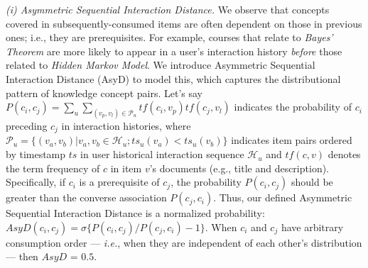 \textit{(i) Asymmetric Sequential Interaction Distance.}
We observe that concepts covered in subsequently-consumed
items are often dependent on those in previous ones; i.e., they are prerequisites. 
For example, courses that relate to \textit{Bayes' Theorem} are more likely to appear in a user's interaction history \textit{before} those related to \textit{Hidden Markov Model}.
We introduce Asymmetric Sequential Interaction Distance (AsyD) to model this, which captures the distributional pattern of knowledge concept pairs.
Let's say $P(c_i,c_j) = \sum_{u} \sum_{(v_{p}, v_{l}) \in \mathcal{P}_u} tf(c_i, v_{p}) tf(c_j, v_{l})$ indicates the probability of $c_i$ preceding $c_j$ in interaction histories, where $\mathcal{P}_u = \{(v_a,v_b) | v_a, v_b \in \mathcal{H}_u; ts_u(v_a)<ts_u(v_b)\}$ indicates item pairs ordered by timestamp $ts$ in user historical interaction sequence $\mathcal{H}_u$ and $tf(c,v)$ denotes the term frequency of $c$ in item $v$'s documents (e.g., title and description). 
Specifically, if $c_i$ is a prerequisite of $c_j$, the probability $P(c_i,c_j)$ should be greater than the 
converse association $P(c_j,c_i)$.
Thus, our defined Asymmetric Sequential Interaction Distance is a normalized probability: 
$AsyD\left(c_i, c_j\right) = \sigma \{P(c_i,c_j) / P(c_j,c_i) -1\}$.
When $c_i$ and $c_j$ have arbitrary consumption order --- \textit{i.e.}, when they are independent of each other's distribution --- then $AsyD$ = $0.5$. 

